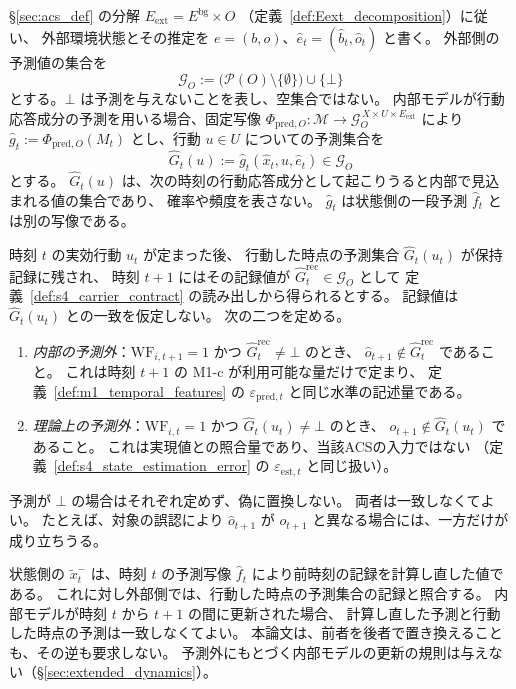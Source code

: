 \begin{definition}
\label{def:env_set_prediction}
\S\ref{sec:acs_def} の分解 $E_{\mathrm{ext}}=E^{\mathrm{bg}}\times O$
（定義~\ref{def:Eext_decomposition}）に従い、
外部環境状態とその推定を $e=(b,o)$、$\hat e_t=(\hat b_t,\hat o_t)$ と書く。
外部側の予測値の集合を
\[
  \mathcal G_O:=\bigl(\mathcal P(O)\setminus\{\emptyset\}\bigr)\cup\{\bot\}
\]
とする。$\bot$ は予測を与えないことを表し、空集合ではない。
内部モデルが行動応答成分の予測を用いる場合、固定写像
$\Phi_{\mathrm{pred},O}:\mathcal M\to\mathcal G_O^{\,X\times U\times E_{\mathrm{ext}}}$
により $\hat g_t:=\Phi_{\mathrm{pred},O}(M_t)$ とし、行動 $u\in U$ についての予測集合を
\[
  \hat G_t(u):=\hat g_t(\hat x_t,u,\hat e_t)\in\mathcal G_O
\]
とする。
$\hat G_t(u)$ は、次の時刻の行動応答成分として起こりうると内部で見込まれる値の集合であり、
確率や頻度を表さない。
$\hat g_t$ は状態側の一段予測 $\hat f_t$ とは別の写像である。
\end{definition}

\begin{definition}
\label{def:prediction_record_check}
時刻 $t$ の実効行動 $u_t$ が定まった後、
行動した時点の予測集合 $\hat G_t(u_t)$ が保持記録に残され、
時刻 $t+1$ にはその記録値が $\hat G^{\mathrm{rec}}_{t}\in\mathcal G_O$ として
定義~\ref{def:s4_carrier_contract} の読み出しから得られるとする。
記録値は $\hat G_t(u_t)$ との一致を仮定しない。
次の二つを定める。
\begin{enumerate}[label=(\roman*)]
  \item \emph{内部の予測外}：$\mathrm{WF}_{i,t+1}=1$ かつ $\hat G^{\mathrm{rec}}_{t}\neq\bot$ のとき、
  $\hat o_{t+1}\notin\hat G^{\mathrm{rec}}_{t}$ であること。
  これは時刻 $t+1$ の M1-c が利用可能な量だけで定まり、
  定義~\ref{def:m1_temporal_features} の $\varepsilon_{\mathrm{pred},t}$ と同じ水準の記述量である。
  \item \emph{理論上の予測外}：$\mathrm{WF}_{i,t}=1$ かつ $\hat G_t(u_t)\neq\bot$ のとき、
  $o_{t+1}\notin\hat G_t(u_t)$ であること。
  これは実現値との照合量であり、当該ACSの入力ではない
  （定義~\ref{def:s4_state_estimation_error} の $\varepsilon_{\mathrm{est},t}$ と同じ扱い）。
\end{enumerate}
予測が $\bot$ の場合はそれぞれ定めず、偽に置換しない。
両者は一致しなくてよい。
たとえば、対象の誤認により $\hat o_{t+1}$ が $o_{t+1}$ と異なる場合には、一方だけが成り立ちうる。
\end{definition}

\begin{remark}[二つの予測の照合基準の違い]
\label{rem:prediction_reference_difference}
状態側の $\tilde x_t^{-}$ は、時刻 $t$ の予測写像 $\hat f_t$ により前時刻の記録を計算し直した値である。
これに対し外部側では、行動した時点の予測集合の記録と照合する。
内部モデルが時刻 $t$ から $t+1$ の間に更新された場合、
計算し直した予測と行動した時点の予測は一致しなくてよい。
本論文は、前者を後者で置き換えることも、その逆も要求しない。
予測外にもとづく内部モデルの更新の規則は与えない（\S\ref{sec:extended_dynamics}）。
\end{remark}


